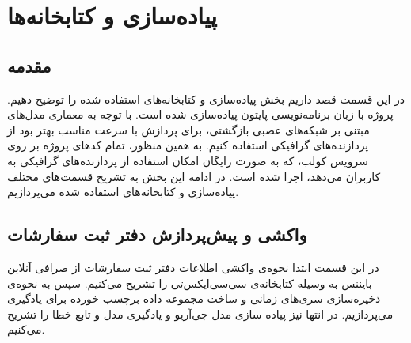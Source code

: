 \chapter{پیاده‌سازی و کتابخانه‌ها}

\section{مقدمه}
در این قسمت قصد داریم بخش پیاده‌سازی و کتابخانه‌های استفاده ‌شده را توضیح دهیم. پروژه با زبان برنامه‌نویسی پایتون پیاده‌سازی شده است. با توجه به معماری مدل‌های مبتنی بر شبکه‌های عصبی بازگشتی، برای پردازش با سرعت مناسب بهتر بود از پردازنده‌های گرافیکی استفاده کنیم. به همین منظور، تمام کدهای پروژه بر روی سرویس کولب، که به صورت رایگان امکان استفاده از پردازنده‌های گرافیکی به کاربران می‌دهد، اجرا شده است. در ادامه این بخش به تشریح قسمت‌های مختلف پیاده‌سازی و کتابخانه‌های استفاده ‌شده می‌پردازیم.

\section{واکشی و پیش‌پردازش دفتر ثبت سفارشات}
در این قسمت ابتدا نحوه‌ی واکشی اطلاعات دفتر ثبت سفارشات از صرافی آنلاین بایننس به وسیله کتابخانه‌ی سی‌سی‌ایکس‌تی را تشریح می‌کنیم. سپس به نحوه‌ی ذخیره‌سازی سری‌های زمانی و ساخت مجموعه داده برچسب خورده برای یادگیری می‌پردازیم. در انتها نیز پیاده سازی مدل جی‌آريو و یادگیری مدل و تابع خطا را تشریح می‌کنیم.
